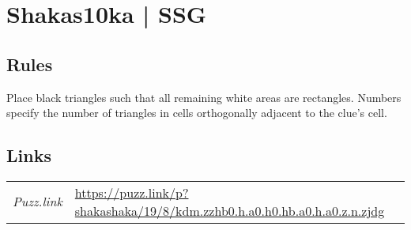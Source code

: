 \section{Shakas10ka | {\normalfont SSG}}
\label{sec:17-shakas10ka-ssg}

\subsection*{Rules}
\begin{markdown}
Place black triangles such that all remaining white areas are rectangles. Numbers specify the number of triangles in cells orthogonally adjacent to the clue's cell.
\end{markdown}
\subsection*{Links}
\begin{tabularx}{\textwidth}{l X}
\emph{Puzz.link} & \url{https://puzz.link/p?shakashaka/19/8/kdm.zzhb0.h.a0.h0.hb.a0.h.a0.z.n.zjdg} \\
\end{tabularx}
\pagebreak
